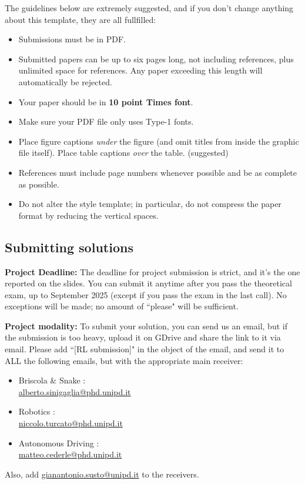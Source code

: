 \documentclass{article}
\begin{document}
The guidelines below are extremely suggested, and if you don't change anything about this template, they are all fullfilled:
\begin{itemize}
\item Submissions must be in PDF\@.
\item Submitted papers can be up to six pages long, not including references, plus unlimited space for references. Any paper exceeding this length will automatically be rejected. 
\item Your paper should be in \textbf{10 point Times font}.
\item Make sure your PDF file only uses Type-1 fonts.
\item Place figure captions \emph{under} the figure (and omit titles from inside
    the graphic file itself). Place table captions \emph{over} the table. (suggested)
\item References must include page numbers whenever possible and be as complete
    as possible. 
\item Do not alter the style template; in particular, do not compress the paper
    format by reducing the vertical spaces.
\end{itemize}

\subsection{Submitting solutions}

\textbf{Project Deadline:} The deadline for project submission is strict, and it's the one reported on the slides. You can submit it anytime after you pass the theoretical exam, up to September 2025 (except if you pass the exam in the last call). No exceptions will be made; no amount of ``please" will be sufficient.

\textbf{Project modality:} To submit your solution, you can send us an email, but if the submission is too heavy, upload it on GDrive and share the link to it via email. Please add ``[RL submission]" in the object of the email, and send it to ALL the following emails, but with the appropriate main receiver:
\begin{itemize}
    \item Briscola \& Snake : \\\url{alberto.sinigaglia@phd.unipd.it}
    \item Robotics : \\\url{niccolo.turcato@phd.unipd.it}
    \item Autonomous Driving : \\\url{matteo.cederle@phd.unipd.it}
\end{itemize}
Also, add \url{gianantonio.susto@unipd.it} to the receivers.
\end{document}
